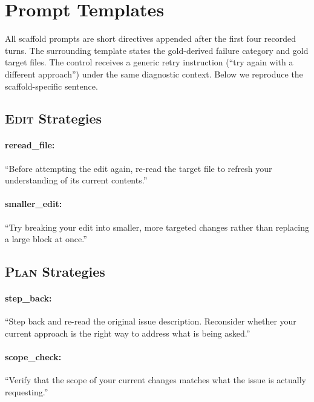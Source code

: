 \documentclass{article}
\begin{document}



\appendix

\section{Prompt Templates}
\label{app:prompts}

All scaffold prompts are short directives appended after the first four recorded
turns.  The surrounding template states the gold-derived failure category and
gold target files.  The control receives a generic retry instruction (``try
again with a different approach'') under the same diagnostic context.  Below we
reproduce the scaffold-specific sentence.

\subsection{\textsc{Edit} Strategies}

\paragraph{reread\_file:} ``Before attempting the edit again, re-read the target file to refresh your understanding of its current contents.''

\paragraph{smaller\_edit:} ``Try breaking your edit into smaller, more targeted changes rather than replacing a large block at once.''

\subsection{\textsc{Plan} Strategies}

\paragraph{step\_back:} ``Step back and re-read the original issue description. Reconsider whether your current approach is the right way to address what is being asked.''

\paragraph{scope\_check:} ``Verify that the scope of your current changes matches what the issue is actually requesting.''
\end{document}
